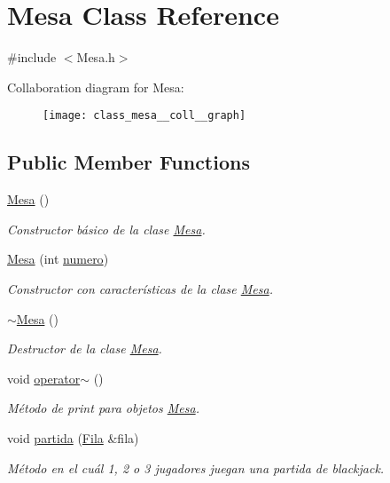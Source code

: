 \hypertarget{class_mesa}{\section{Mesa Class Reference}
\label{class_mesa}
}


{\ttfamily \#include $<$Mesa.\+h$>$}



Collaboration diagram for Mesa\+:
\nopagebreak
\begin{figure}[H]
\begin{center}
\leavevmode
\texttt{[image: class\_mesa\_\_coll\_\_graph]}
\end{center}
\end{figure}
\subsection*{Public Member Functions}
\begin{DoxyCompactItemize}
\item 
\hyperlink{class_mesa_a98794038db53804cb4295480c96b2c20}{Mesa} ()
\begin{DoxyCompactList}\small\item\em Constructor básico de la clase \hyperlink{class_mesa}{Mesa}. \end{DoxyCompactList}\item 
\hyperlink{class_mesa_ac3c8674720bcb7e078272d4e95c422dc}{Mesa} (int \hyperlink{class_mesa_a704a565a0ac29cb726bb1a4e826a8127}{numero})
\begin{DoxyCompactList}\small\item\em Constructor con características de la clase \hyperlink{class_mesa}{Mesa}. \end{DoxyCompactList}\item 
\hyperlink{class_mesa_aa0a1b83b8058f80f4f27ec46cc5e9524}{$\sim$\+Mesa} ()
\begin{DoxyCompactList}\small\item\em Destructor de la clase \hyperlink{class_mesa}{Mesa}. \end{DoxyCompactList}\item 
void \hyperlink{class_mesa_aad6dc6e5101774e4caad60b01c9225b1}{operator$\sim$} ()
\begin{DoxyCompactList}\small\item\em Método de print para objetos \hyperlink{class_mesa}{Mesa}. \end{DoxyCompactList}\item 
void \hyperlink{class_mesa_a3b925c89a9f8ec6f1b43bbf70c76bb5d}{partida} (\hyperlink{class_fila}{Fila} \&fila)
\begin{DoxyCompactList}\small\item\em Método en el cuál 1, 2 o 3 jugadores juegan una partida de blackjack. \end{DoxyCompactList}\end{DoxyCompactItemize}
